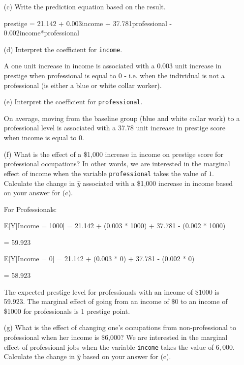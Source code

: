 \documentclass[12pt,letterpaper]{article}
\begin{document}
\begin{enumerate}
	\newpage
	\item [(c)]
	Write the prediction equation based on the result.
	
	\noindent
	prestige = 21.142 + 0.003income + 37.781professional - 0.002income*professional
	\vspace*{2cm}

	\item [(d)]
	Interpret the coefficient for \texttt{income}.
	
	\noindent
	A one unit increase in income is associated with a 0.003 unit increase in prestige when professional is equal to 0 - i.e. when the individual is not a professional (is either a blue or 
	white collar worker).
	
	\vspace{2cm}	
	\item [(e)]
	Interpret the coefficient for \texttt{professional}.
	
	\noindent
	On average, moving from the baseline group (blue and white collar work) to a professional level is associated with a 37.78 unit increase in prestige score when income is equal to 0.
	
	\vspace{2cm}	
	\item [(f)]
	What is the effect of a \$1,000 increase in income on prestige score for professional occupations? In other words, we are interested in the marginal effect of income when the variable \texttt{professional} takes the value of $1$. Calculate the change in $\hat{y}$ associated with a \$1,000 increase in income based on your answer for (c).
	

	\noindent
	
	For Professionals: 
	
	E[Y$|$Income = 1000] = 21.142 + (0.003 * 1000) + 37.781 - (0.002 * 1000)
	
	= 59.923
	
	\vspace*{0.5cm}
	E[Y$|$Income = 0] = 21.142 + (0.003 * 0) + 37.781 - (0.002 * 0)
	
	= 58.923
	
	\vspace*{0.5cm}
	The expected prestige level for professionals with an income of \$1000 is 59.923. The marginal effect of going from an income of \$0 to an income of \$1000 for professionals is 1 prestige point.
	
	\vspace{10cm}
	
	
	\item [(g)]
	What is the effect of changing one's occupations from non-professional to professional when her income is \$6,000? We are interested in the marginal effect of professional jobs when the variable \texttt{income} takes the value of $6,000$. Calculate the change in $\hat{y}$ based on your answer for (c).
	

\end{enumerate}
\end{document}
